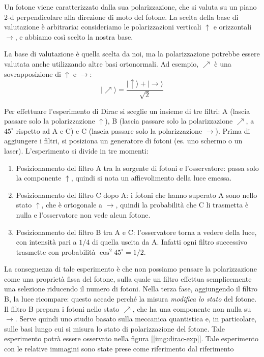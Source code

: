Un fotone viene caratterizzato dalla sua polarizzazione, che si valuta su un piano 2-d perpendicolare alla direzione di moto del fotone. La scelta della base di valutazione è arbitraria: consideriamo le polarizzazioni verticali \(\uparrow\) e orizzontali \(\rightarrow\), e abbiamo così scelto la nostra base.

\begin{warn}
La base di valutazione è quella scelta da noi, ma la polarizzazione potrebbe essere valutata anche utilizzando altre basi ortonormali. Ad esempio, \(\nearrow\) è una sovrapposizione di \(\uparrow\) e \(\rightarrow\):
\[
|\nearrow\rangle = \frac{|\uparrow\rangle + |\rightarrow\rangle}{\sqrt{2}}
\]
\end{warn}

Per effettuare l'esperimento di Dirac si sceglie un insieme di tre filtri: A (lascia passare solo la polarizzazione \(\uparrow\)), B (lascia passare solo la polarizzazione \(\nearrow\), a \(45^\circ\) rispetto ad A e C) e C (lascia passare solo la polarizzazione \(\rightarrow\)).
Prima di aggiungere i filtri, si posiziona un generatore di fotoni (es. uno schermo o un laser).
L'esperimento si divide in tre momenti:
\begin{enumerate}
\item Posizionamento del filtro A tra la sorgente di fotoni e l'osservatore: passa solo la componente \(\uparrow\), quindi si nota un affievolimento della luce emessa.
\item Posizionamento del filtro C dopo A: i fotoni che hanno superato A sono nello stato \(\uparrow\), che è ortogonale a \(\rightarrow\), quindi la probabilità che C li trasmetta è nulla e l'osservatore non vede alcun fotone.
\item Posizionamento del filtro B tra A e C: l'osservatore torna a vedere della luce, con intensità pari a \(1/4\) di quella uscita da A. Infatti ogni filtro successivo trasmette con probabilità \(\cos^2 45^\circ = 1/2\).
\end{enumerate}

La conseguenza di tale esperimento è che non possiamo pensare la polarizzazione come una proprietà fissa del fotone, sulla quale un filtro effettua semplicemente una selezione riducendo il numero di fotoni. Nella terza fase, aggiungendo il filtro B, la luce ricompare: questo accade perché la misura \emph{modifica lo stato} del fotone. Il filtro B prepara i fotoni nello stato \(\nearrow\), che ha una componente non nulla su \(\rightarrow\). Serve quindi uno studio basato sulla meccanica quantistica e, in particolare, sulle basi lungo cui si misura lo stato di polarizzazione del fotone. Tale esperimento potrà essere osservato nella figura [\ref{img:dirac-exp}]. Tale esperimento con le relative immagini sono state prese come riferimento dal riferimento \cite{gentle2011quantum}

